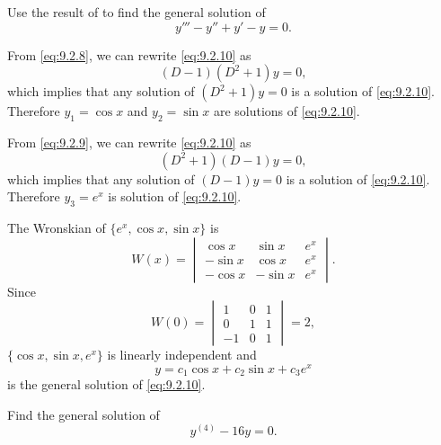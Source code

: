 \begin{example}\label{example:9.2.3}
Use the result of  to find the general
solution of
\begin{equation} \label{eq:9.2.10}
y'''-y''+y'-y=0.
\end{equation}
\end{example}

\begin{solution}
From \eqref{eq:9.2.8}, we can rewrite \eqref{eq:9.2.10} as
\[
(D-1)(D^2+1)y=0,
\]
which implies that any solution of $(D^2+1)y=0$ is a solution of
\eqref{eq:9.2.10}. Therefore $y_1=\cos x$ and $y_2=\sin x$ are solutions
of \eqref{eq:9.2.10}.

From \eqref{eq:9.2.9}, we can rewrite \eqref{eq:9.2.10} as
\[
(D^2+1)(D-1)y=0,
\]
which implies that any solution of $(D-1)y=0$ is a solution of
\eqref{eq:9.2.10}. Therefore $y_3=e^x$ is solution of \eqref{eq:9.2.10}.

The Wronskian of $\{e^x,\cos x,\sin x\}$ is
\[
W(x)=\begin{vmatrix}
\cos x&\sin x&e^x\\
-\sin x&\cos x&e^x\\
-\cos x&-\sin x&e^x
\end{vmatrix}.
\]
Since
\[
W(0)=\begin{vmatrix}1&0&1\\0&1&1\\-1&0&1\end{vmatrix}=2,
\]
$\{\cos x,\sin x,e^x\}$ is linearly independent
and
\[
y=c_1\cos x+c_2\sin x+c_3e^x
\]
is the general solution of \eqref{eq:9.2.10}.
\end{solution}

\begin{example}\label{example:9.2.4}
Find the general solution of
\begin{equation} \label{eq:9.2.11}
y^{(4)}-16y=0.
\end{equation}
\end{example}

